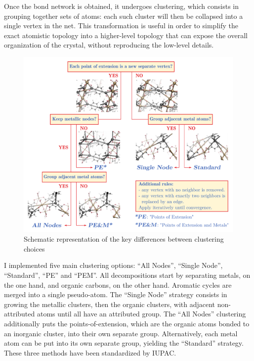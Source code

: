 \documentclass[main.tex]{subfiles}
\begin{document}
Once the bond network is obtained, it undergoes clustering, which consists in grouping together sets of atoms: each such cluster will then be collapsed into a single vertex in the net. This transformation is useful in order to simplify the exact atomistic topology into a higher-level topology that can expose the overall organization of the crystal, without reproducing the low-level details. %

\begin{figure}
	\centering
	\includegraphics[width=\linewidth]{figures/topology/clustering.pdf}

	\caption{Schematic representation of the key differences between clustering choices}\label{fig:clustering}
\end{figure}

I implemented five main clustering options: ``All Nodes'', ``Single Node'', ``Standard'', ``PE'' and ``PEM''. All decompositions start by separating metals, on the one hand, and organic carbons, on the other hand. Aromatic cycles are merged into a single pseudo-atom. The ``Single Node'' strategy\autocite{IUPAC_SBU} consists in growing the metallic clusters, then the organic clusters, with adjacent non-attributed atoms until all have an attributed group. The ``All Nodes'' clustering\autocite{IUPAC_SBU} additionally puts the points-of-extension\autocite{UnifiedTopology,YaghiRodMOFs}, which are the organic atoms bonded to an inorganic cluster, into their own separate group. Alternatively, each metal atom can be put into its own separate group, yielding the ``Standard'' strategy. These three methods have been standardized by IUPAC\autocite{IUPAC_SBU}.
\end{document}
